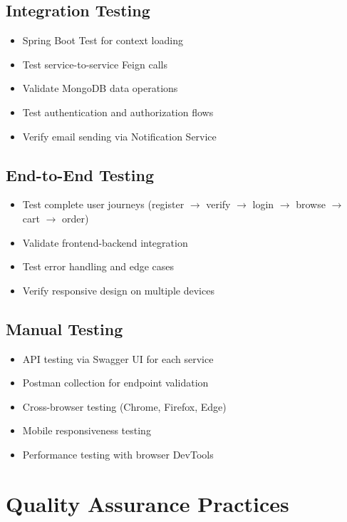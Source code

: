 \subsection{Integration Testing}

\begin{itemize}
    \item Spring Boot Test for context loading
    \item Test service-to-service Feign calls
    \item Validate MongoDB data operations
    \item Test authentication and authorization flows
    \item Verify email sending via Notification Service
\end{itemize}

\subsection{End-to-End Testing}

\begin{itemize}
    \item Test complete user journeys (register $\rightarrow$ verify $\rightarrow$ login $\rightarrow$ browse $\rightarrow$ cart $\rightarrow$ order)
    \item Validate frontend-backend integration
    \item Test error handling and edge cases
    \item Verify responsive design on multiple devices
\end{itemize}

\subsection{Manual Testing}

\begin{itemize}
    \item API testing via Swagger UI for each service
    \item Postman collection for endpoint validation
    \item Cross-browser testing (Chrome, Firefox, Edge)
    \item Mobile responsiveness testing
    \item Performance testing with browser DevTools
\end{itemize}

\section{Quality Assurance Practices}

